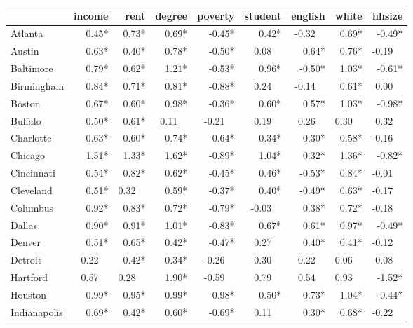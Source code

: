 \fontsize{9}{10}\selectfont
\begin{tabular}{lrrrrrrrr}
	
	\toprule
	{}             & income &    rent &  degree & poverty & student & english &   white &  hhsize \\ \midrule
	Atlanta        &  0.45* &   0.73* &   0.69* &  -0.45* &   0.42* & -0.32~~ &   0.69* &  -0.49* \\
	Austin         &  0.63* &   0.40* &   0.78* &  -0.50* &  0.08~~ &   0.64* &   0.76* & -0.19~~ \\
	Baltimore      &  0.79* &   0.62* &   1.21* &  -0.53* &   0.96* &  -0.50* &   1.03* &  -0.61* \\
	Birmingham     &  0.84* &   0.71* &   0.81* &  -0.88* &  0.24~~ & -0.14~~ &   0.61* &  0.00~~ \\
	Boston         &  0.67* &   0.60* &   0.98* &  -0.36* &   0.60* &   0.57* &   1.03* &  -0.98* \\
	Buffalo        &  0.50* &   0.61* &  0.11~~ & -0.21~~ &  0.19~~ &  0.26~~ &  0.30~~ &  0.32~~ \\
	Charlotte      &  0.63* &   0.60* &   0.74* &  -0.64* &   0.34* &   0.30* &   0.58* & -0.16~~ \\
	Chicago        &  1.51* &   1.33* &   1.62* &  -0.89* &   1.04* &   0.32* &   1.36* &  -0.82* \\
	Cincinnati     &  0.54* &   0.82* &   0.62* &  -0.45* &   0.46* &  -0.53* &   0.84* & -0.01~~ \\
	Cleveland      &  0.51* &  0.32~~ &   0.59* &  -0.37* &   0.40* &  -0.49* &   0.63* & -0.17~~ \\
	Columbus       &  0.92* &   0.83* &   0.72* &  -0.79* & -0.03~~ &   0.38* &   0.72* & -0.18~~ \\
	Dallas         &  0.90* &   0.91* &   1.01* &  -0.83* &   0.67* &   0.61* &   0.97* &  -0.49* \\
	Denver         &  0.51* &   0.65* &   0.42* &  -0.47* &  0.27~~ &   0.40* &   0.41* & -0.12~~ \\
	Detroit        & 0.22~~ &   0.42* &   0.34* & -0.26~~ &  0.30~~ &  0.22~~ &  0.06~~ &  0.08~~ \\
	Hartford       & 0.57~~ &  0.28~~ &   1.90* & -0.59~~ &  0.79~~ &  0.54~~ &  0.93~~ &  -1.52* \\
	Houston        &  0.99* &   0.95* &   0.99* &  -0.98* &   0.50* &   0.73* &   1.04* &  -0.44* \\
	Indianapolis   &  0.69* &   0.42* &   0.60* &  -0.69* &  0.11~~ &   0.30* &   0.68* & -0.22~~ \\

\end{tabular}
